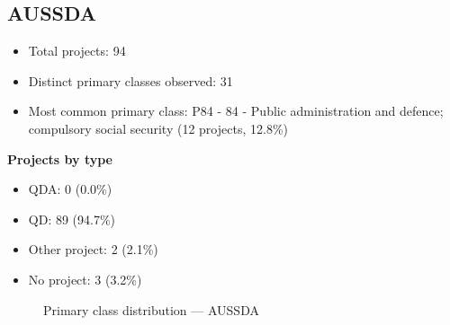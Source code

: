 \subsection{AUSSDA}

\begin{itemize}
    \item Total projects: 94
    \item Distinct primary classes observed: 31
    \item Most common primary class: P84 - 84 - Public administration and defence; compulsory social security (12 projects, 12.8\%)
\end{itemize}
\textbf{Projects by type}
\begin{itemize}
    \item QDA: 0 (0.0\%)
    \item QD: 89 (94.7\%)
    \item Other project: 2 (2.1\%)
    \item No project: 3 (3.2\%)
\end{itemize}

\begin{figure}[h]
    \centering
    
    \caption{Primary class distribution --- AUSSDA}
\end{figure}

